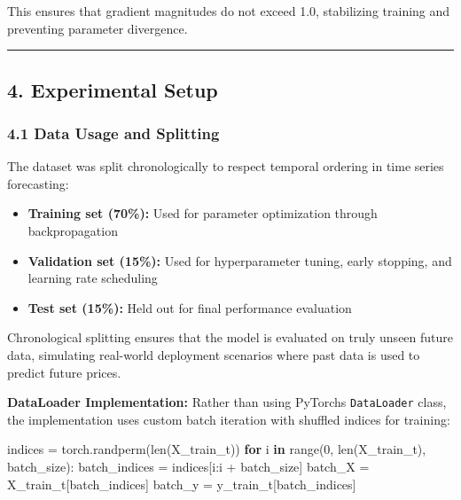 \documentclass[
]{article}
\newenvironment{Shaded}{}{}
\newcommand{\BuiltInTok}[1]{\textcolor[rgb]{0.00,0.50,0.00}{#1}}
\newcommand{\ControlFlowTok}[1]{\textcolor[rgb]{0.00,0.44,0.13}{\textbf{#1}}}
\newcommand{\DecValTok}[1]{\textcolor[rgb]{0.25,0.63,0.44}{#1}}
\newcommand{\KeywordTok}[1]{\textcolor[rgb]{0.00,0.44,0.13}{\textbf{#1}}}
\newcommand{\NormalTok}[1]{#1}
\newcommand{\OperatorTok}[1]{\textcolor[rgb]{0.40,0.40,0.40}{#1}}
\begin{document}
This ensures that gradient magnitudes do not exceed 1.0, stabilizing
training and preventing parameter divergence.

\begin{center}\rule{0.5\linewidth}{0.5pt}\end{center}

\pagebreak

\subsection{4. Experimental Setup}\label{4-experimental-setup}

\subsubsection{4.1 Data Usage and
Splitting}\label{41-data-usage-and-splitting}

The dataset was split chronologically to respect temporal ordering in
time series forecasting:

\begin{itemize}
\item
  \textbf{Training set (70\%):} Used for parameter optimization through
  backpropagation
\item
  \textbf{Validation set (15\%):} Used for hyperparameter tuning, early
  stopping, and learning rate scheduling
\item
  \textbf{Test set (15\%):} Held out for final performance evaluation
\end{itemize}

Chronological splitting ensures that the model is evaluated on truly
unseen future data, simulating real-world deployment scenarios where
past data is used to predict future prices.

\textbf{DataLoader Implementation:} Rather than using
PyTorch\textquotesingle s \texttt{DataLoader} class, the implementation
uses custom batch iteration with shuffled indices for training:

\begin{Shaded}
\begin{Highlighting}[]
\NormalTok{indices }\OperatorTok{=}\NormalTok{ torch.randperm(}\BuiltInTok{len}\NormalTok{(X\_train\_t))}
\ControlFlowTok{for}\NormalTok{ i }\KeywordTok{in} \BuiltInTok{range}\NormalTok{(}\DecValTok{0}\NormalTok{, }\BuiltInTok{len}\NormalTok{(X\_train\_t), batch\_size):}
\NormalTok{    batch\_indices }\OperatorTok{=}\NormalTok{ indices[i:i }\OperatorTok{+}\NormalTok{ batch\_size]}
\NormalTok{    batch\_X }\OperatorTok{=}\NormalTok{ X\_train\_t[batch\_indices]}
\NormalTok{    batch\_y }\OperatorTok{=}\NormalTok{ y\_train\_t[batch\_indices]}
\end{Highlighting}
\end{Shaded}
\end{document}
